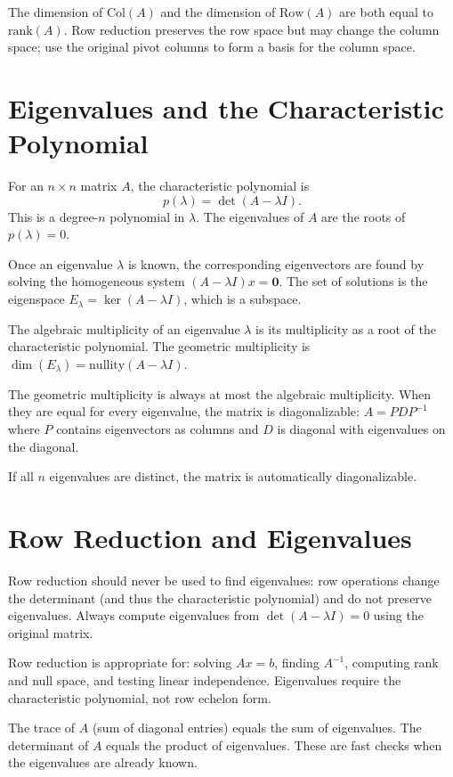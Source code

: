 \documentclass[11pt]{article}
\begin{document}
The dimension of $\text{Col}(A)$ and the dimension of $\text{Row}(A)$ are both equal to $\text{rank}(A)$. Row reduction preserves the row space but may change the column space; use the original pivot columns to form a basis for the column space.

\section*{Eigenvalues and the Characteristic Polynomial}

For an $n \times n$ matrix $A$, the characteristic polynomial is
\[
p(\lambda) = \det(A - \lambda I).
\]
This is a degree-$n$ polynomial in $\lambda$. The eigenvalues of $A$ are the roots of $p(\lambda) = 0$.

Once an eigenvalue $\lambda$ is known, the corresponding eigenvectors are found by solving the homogeneous system $(A - \lambda I)x = \mathbf{0}$. The set of solutions is the eigenspace $E_\lambda = \ker(A - \lambda I)$, which is a subspace.

The algebraic multiplicity of an eigenvalue $\lambda$ is its multiplicity as a root of the characteristic polynomial. The geometric multiplicity is $\dim(E_\lambda) = \text{nullity}(A - \lambda I)$.

The geometric multiplicity is always at most the algebraic multiplicity. When they are equal for every eigenvalue, the matrix is diagonalizable: $A = PDP^{-1}$ where $P$ contains eigenvectors as columns and $D$ is diagonal with eigenvalues on the diagonal.

If all $n$ eigenvalues are distinct, the matrix is automatically diagonalizable.

\section*{Row Reduction and Eigenvalues}

Row reduction should never be used to find eigenvalues: row operations change the determinant (and thus the characteristic polynomial) and do not preserve eigenvalues. Always compute eigenvalues from $\det(A - \lambda I) = 0$ using the original matrix.

Row reduction is appropriate for: solving $Ax = b$, finding $A^{-1}$, computing rank and null space, and testing linear independence. Eigenvalues require the characteristic polynomial, not row echelon form.

The trace of $A$ (sum of diagonal entries) equals the sum of eigenvalues. The determinant of $A$ equals the product of eigenvalues. These are fast checks when the eigenvalues are already known.
\end{document}
